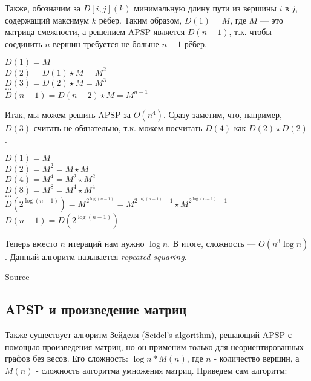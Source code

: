 Также, обозначим за $D[i,j](k)$ минимальную длину пути из вершины $i$ в $j$, содержащий максимум $k$ рёбер.
Таким образом, $D(1) = M$, где $M$ --- это матрица смежности, а решением APSP является $D(n-1)$, т.к. чтобы соединить $n$ вершин требуется не больше $n-1$ рёбер.

\begin{center}
    $D(1) = M$ \\
    $D(2) = D(1) \star M = M^2$ \\
    $D(3) = D(2) \star M = M^3$ \\
    $\dots$ \\
    $D(n-1) = D(n-2) \star M = M^{n-1}$ \\
\end{center}

Итак, мы можем решить APSP за $O(n^4)$.
Сразу заметим, что, например, $D(3)$ считать не обязательно, т.к. можем посчитать $D(4)$ как $D(2) \star D(2)$.

\begin{center}
    $D(1) = M$ \\
    $D(2) = M^2 = M \star M$ \\
    $D(4) = M^4 = M^2 \star M^2$ \\
    $D(8) = M^8 = M^4 \star M^4$ \\
    $\dots$ \\
    $D(2^{\log(n-1)}) = M^{2^{\log(n-1)}} = M^{2^{\log(n-1)} - 1} \star M^{2^{\log(n-1)} - 1}$ \\
    $D(n-1) = D(2^{\log(n-1)})$ \\
\end{center}

Теперь вместо $n$ итераций нам нужно $\log{n}$. В итоге, сложность --- $O(n^3 \log{n})$.
Данный алгоритм называется \textit{repeated squaring}.


\href{http://users.cecs.anu.edu.au/~Alistair.Rendell/Teaching/apac_comp3600/module4/all_pairs_shortest_paths.xhtml}{Source}


\subsection{APSP и произведение матриц}
Также существует алгоритм Зейделя (Seidel's algorithm), решающий APSP с помощью произведения матриц, но он применим только для неориентированных графов без весов. Его сложность: $\log n * M(n)$, где $n$ - количество вершин, а $M(n)$ - сложность алгоритма умножения матриц. Приведем сам алгоритм:

